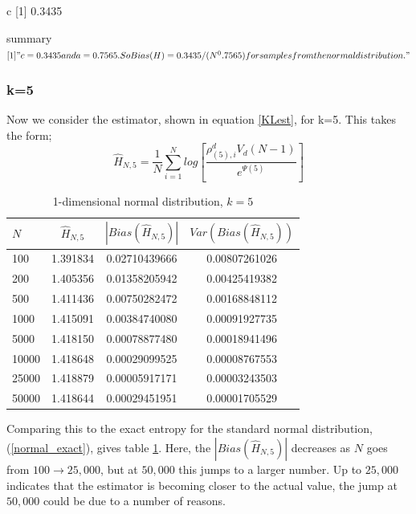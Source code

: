 \documentclass{article}
\begin{document}
c
[1] 0.3435

summary
$[1] "c = 0.3435 and a = 0.7565. So Bias(H) = 0.3435/(N^0.7565)  for samples from the normal distribution."$



\subsubsection{k=5} \label{N_k=5}

Now we consider the estimator, shown in equation \ref{KLest}, for k=5. This takes the form;
\begin{equation}
\hat{H}_{N, 5} = \frac{1}{N} \sum_{i=1}^{N} log \left[ \frac{\rho_{(5),i}^{d} V_{d} (N-1)}{e^{\Psi(5)}} \right] \nonumber
\end{equation}

\begin{table}
\caption{1-dimensional normal distribution, $k=5$} \label{normal_k=5_table}
\begin{center}
\begin{tabular}{| l | c c c|} 
\toprule
$N$ & $\hat{H}_{N, 5}$ & $|Bias(\hat{H}_{N, 5})|$ & $Var(Bias(\hat{H}_{N, 5}))$ \\
\midrule[1pt]
100     & 1.391834     & 0.02710439666     & 0.00807261026  \\
200     & 1.405356     & 0.01358205942     & 0.00425419382  \\
500     & 1.411436     & 0.00750282472     & 0.00168848112  \\
1000    & 1.415091     & 0.00384740080     & 0.00091927735  \\
5000    & 1.418150     & 0.00078877480     & 0.00018941496  \\
10000   & 1.418648     & 0.00029099525     & 0.00008767553  \\
25000   & 1.418879     & 0.00005917171     & 0.00003243503  \\
50000   & 1.418644     & 0.00029451951     & 0.00001705529  \\
\hline
\end{tabular}
\end{center}
\end{table}

Comparing this to the exact entropy for the standard normal distribution, (\ref{normal_exact}), gives table \ref{normal_k=5_table}. Here, the $|Bias(\hat{H}_{N, 5})|$ decreases as $N$ goes from $100 \to 25,000$, but at $50,000$ this jumps to a larger number. Up to $25,000$ indicates that the estimator is becoming closer to the actual value, the jump at $50,000$  could be due to a number of reasons. 
\end{document}
